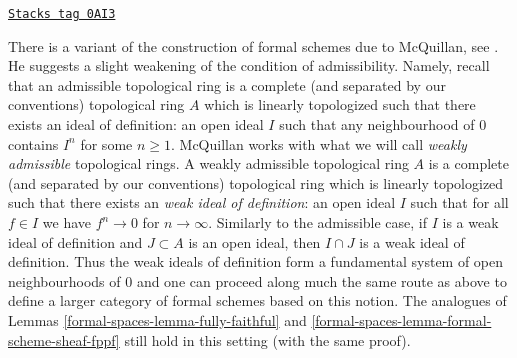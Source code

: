 \begin{remark}

\label{formal-spaces-remark-mcquillan}
\href{https://stacks.math.columbia.edu/tag/0AI3}{\texttt{Stacks tag 0AI3}}

There is a variant of the construction of formal schemes due to
McQuillan, see \cite{McQuillan}.
He suggests a slight weakening of the condition of admissibility.
Namely, recall that an admissible topological ring is a complete
(and separated by our conventions) topological ring $A$
which is linearly topologized such that there exists an
ideal of definition: an
open ideal $I$ such that any neighbourhood of $0$ contains $I^n$
for some $n \geq 1$.
McQuillan works with what we will call {\it weakly admissible}
topological rings. A weakly admissible topological ring $A$ is a
complete (and separated by our conventions) topological ring
which is linearly topologized such that there exists an
{\it weak ideal of definition}: an open ideal $I$ such that
for all $f \in I$ we have
$f^n \to 0$ for $n \to \infty$. Similarly to the admissible case,
if $I$ is a weak ideal of definition and $J \subset A$ is an
open ideal, then $I \cap J$ is a weak ideal of definition.
Thus the weak ideals of definition form a fundamental system of
open neighbourhoods of $0$ and
one can proceed along much the same route as above
to define a larger category of formal schemes based
on this notion. The analogues of Lemmas \ref{formal-spaces-lemma-fully-faithful} and
\ref{formal-spaces-lemma-formal-scheme-sheaf-fppf}
still hold in this setting (with the same proof).
\end{remark}

